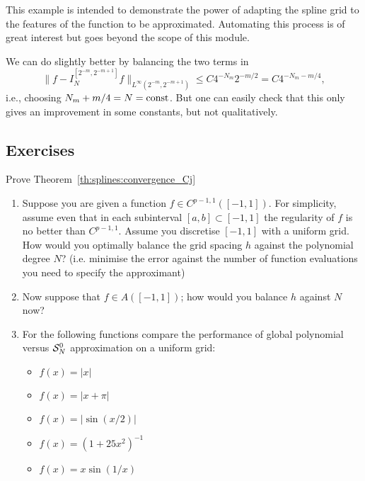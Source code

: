This example is intended to demonstrate the power of adapting the spline grid to
the features of the function to be approximated. Automating this process is of
great interest but goes beyond the scope of this module.

\begin{remark}
    We can do slightly better by balancing the two terms in 
    \[
        \| f - I_N^{[2^{-m},2^{-m+1}]} f\|_{L^\infty(2^{-m},2^{-m+1})}
        \leq 
        C 4^{-N_m} 2^{-m/2}
        = C 4^{- N_m - m/4},
    \]
    i.e., choosing $N_m +  m/4 = N = {\rm const}$. But one can easily 
    check that this only gives an improvement in some constants, but 
    not qualitatively.
\end{remark}

\subsection{Exercises}


\begin{exercise} \label{exr:splines:}
    Prove Theorem~\ref{th:splines:convergence_Cj}
\end{exercise}

\begin{exercise}
    \begin{enumerate} \ilist 
    \item Suppose you are given a function $f \in C^{p-1,1}([-1,1])$. For
    simplicity, assume even that in each subinterval $[a,b] \subset
    [-1,1]$ the regularity of $f$ is no better than $C^{p-1,1}$. Assume
    you discretise $[-1,1]$ with a uniform grid. How would you optimally
    balance the grid spacing $h$ against the polynomial degree $N$?
    (i.e. minimise the error against the number of function evaluations
    you need to specify the approximant)

    \item Now suppose that $f \in A([-1,1])$; how would you balance $h$
    against $N$ now?

    \item For the following functions compare the performance of 
    global polynomial versus $\mathcal{S}_N^0$ approximation on a uniform grid:
    \begin{itemize}
        \item $f(x) = |x|$ 
        \item $f(x) = |x+\pi|$ 
        \item $f(x) = |\sin(x/2)|$ 
        \item $f(x) = (1+25 x^2)^{-1}$
        \item $f(x) = x \sin(1/x)$ 
    \end{itemize}
    \end{enumerate}
\end{exercise}

